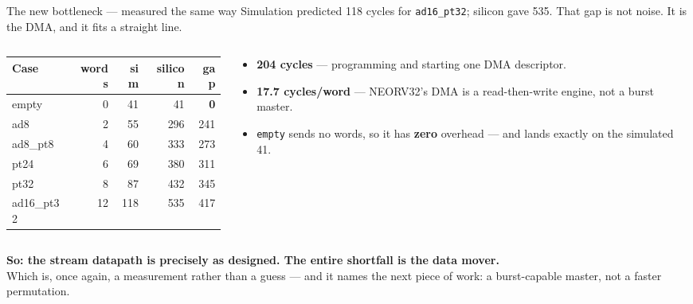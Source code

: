 \documentclass[aspectratio=169,11pt]{beamer}
\newcommand{\code}[1]{\texttt{\small #1}}
\begin{document}
\begin{frame}{The new bottleneck --- measured the same way}
{\small Simulation predicted 118 cycles for \code{ad16\_pt32}; silicon gave 535.
That gap is not noise. It is the DMA, and it fits a straight line.}
\vspace{1mm}
\begin{columns}[c]
\begin{column}{0.48\textwidth}
\centering
{\scriptsize\setlength{\tabcolsep}{5pt}\renewcommand{\arraystretch}{1.08}
\begin{tabular}{lrrrr}
\toprule
\textbf{Case} & \textbf{words} & \textbf{sim} & \textbf{silicon} & \textbf{gap}\\
\midrule
\rowcolor{okgreen!12}
empty      &  0 &  41 &  41 & \textbf{0}\\
ad8        &  2 &  55 & 296 & 241\\
ad8\_pt8   &  4 &  60 & 333 & 273\\
pt24       &  6 &  69 & 380 & 311\\
pt32       &  8 &  87 & 432 & 345\\
ad16\_pt32 & 12 & 118 & 535 & 417\\
\bottomrule
\end{tabular}}
\end{column}
\begin{column}{0.52\textwidth}
\begin{center}
\end{center}
\vspace{1mm}
\begin{itemize}\footnotesize
\item \textbf{204 cycles} --- programming and starting one DMA descriptor.
\item \textbf{17.7 cycles/word} --- NEORV32's DMA is a read-then-write engine,
      not a burst master.
\item \code{empty} sends no words, so it has \textbf{zero} overhead --- and lands
      exactly on the simulated 41.
\end{itemize}
\end{column}
\end{columns}
\vspace{1mm}
{\small\color{docblue}\textbf{So: the stream datapath is precisely as designed. The entire shortfall is the data mover.}}\\
{\footnotesize Which is, once again, a measurement rather than a guess --- and it
names the next piece of work: a burst-capable master, not a faster permutation.}
\end{frame}
\end{document}
